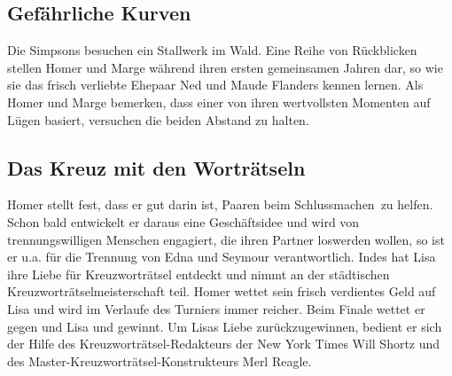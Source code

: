 
\subsection{Gefährliche Kurven}
Die Simpsons besuchen ein Stallwerk im Wald. Eine Reihe von Rückblicken stellen Homer und Marge während ihren ersten gemeinsamen Jahren dar, so wie sie das frisch verliebte Ehepaar Ned und Maude Flanders kennen lernen. Als Homer und Marge bemerken, dass einer von ihren wertvollsten Momenten auf Lügen basiert, versuchen die beiden Abstand zu halten. 


\subsection{Das Kreuz mit den Worträtseln}
Homer stellt fest, dass er gut darin ist, Paaren beim \glqq Schlussmachen\grqq\ zu helfen. Schon bald entwickelt er daraus eine Geschäftsidee und wird von trennungswilligen Menschen engagiert, die ihren Partner loswerden wollen, so ist er u.a. für die Trennung von Edna und Seymour verantwortlich. Indes hat Lisa ihre Liebe für Kreuzworträtsel entdeckt und nimmt an der städtischen Kreuzworträtselmeisterschaft teil. Homer wettet sein frisch verdientes Geld auf Lisa und wird im Verlaufe des Turniers immer reicher. Beim Finale wettet er gegen und Lisa und gewinnt. Um Lisas Liebe zurückzugewinnen, bedient er sich der Hilfe des Kreuzworträtsel-Redakteurs der New York Times Will Shortz und des Master-Kreuzworträtsel-Konstrukteurs Merl Reagle. 



